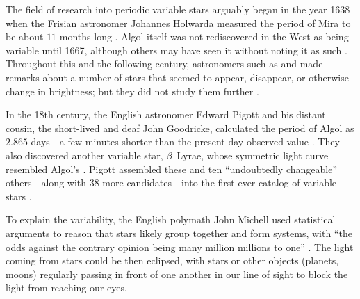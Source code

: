 The field of research into periodic variable stars arguably began in the year 1638 when the Frisian astronomer Johannes Holwarda measured the period of Mira to be about $11$ months long \citep[e.g.,][]{1997JAVSO..25..115H}. 
Algol itself was not rediscovered in the West as being variable until 1667, although others may have seen it without noting it as such \citep[e.g.,][]{bolt2007biographical}. 
Throughout this and the following century, astronomers such as \citet{10.2307/101080} and \citet{flamsteed} made remarks about a number of stars that seemed to appear, disappear, or otherwise change in brightness; but they did not study them further \citep[e.g.,][]{10.2307/106621}. 

\iffalse
\begin{figure}
    \centering
    \frame{\texttt{[image: pics/mira2.png]}}
    \caption[A picture of Mira the Wonderful]{Mira, observed in the ultraviolet by the NASA space telescope \emph{Galaxy Evolution Explorer} (\textsc{GALEX}, 2006). An evolved star, Mira drives a strong stellar wind; its shedded mass appears as a tail spanning $13$ lightyears. 
    \label{fig:mira}}
\end{figure}
\fi

In the 18th century, the English astronomer Edward Pigott and his distant cousin, the short-lived and deaf John Goodricke, calculated the period of Algol as $2.865$ days---a few minutes shorter than the present-day observed value \citep{10.2307/106502,10.2307/106591,2012ApJ...752...20B}. 
They also discovered another variable star, $\beta$~Lyrae, whose symmetric light curve resembled Algol's \citep{1785RSPT...75..127P}. 
Pigott assembled these and ten ``undoubtedly changeable'' others---along with $38$ more candidates---into the first-ever catalog of variable stars \citep{10.2307/106621}. 

To explain the variability, the English polymath John Michell used statistical arguments to reason that stars likely group together and form systems, with ``the odds against the contrary opinion being many million millions to one'' \citep{michell1767inquiry}. 
The light coming from stars could be then eclipsed, with stars or other objects (planets, moons) regularly passing in front of one another in our line of sight to block the light from reaching our eyes. 
\iffalse\epigraph{\emph{``We may from hence, therefore, with the highest probability conclude (the odds against the contrary opinion being many million millions to one) that the stars are really collected together in clusters in some places, where they form a kind of system...''%
}}{The Reverend John Michell \\
\textit{An Inquiry into the Probable Parallax, and Magnitude of the Fixed Stars, from the Quantity of Light Which They Afford us, and the Particular Circumstances of Their Situation} (\citeyear{michell1767inquiry})}\fi

